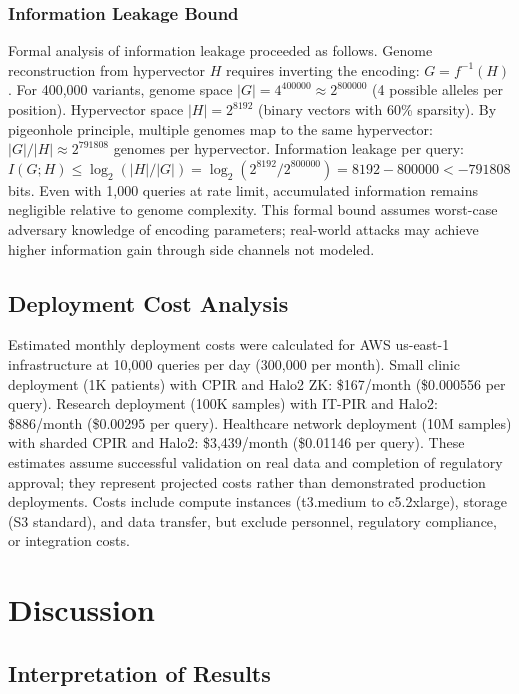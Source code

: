 \documentclass[11pt,letterpaper]{article}
\begin{document}
\subsubsection{Information Leakage Bound}

Formal analysis of information leakage proceeded as follows. Genome reconstruction from hypervector $H$ requires inverting the encoding: $G = f^{-1}(H)$. For 400,000 variants, genome space $|G| = 4^{400000} \approx 2^{800000}$ (4 possible alleles per position). Hypervector space $|H| = 2^{8192}$ (binary vectors with 60\% sparsity). By pigeonhole principle, multiple genomes map to the same hypervector: $|G|/|H| \approx 2^{791808}$ genomes per hypervector. Information leakage per query: $I(G; H) \leq \log_2(|H|/|G|) = \log_2(2^{8192}/2^{800000}) = 8192 - 800000 < -791808$ bits. Even with 1,000 queries at rate limit, accumulated information remains negligible relative to genome complexity. This formal bound assumes worst-case adversary knowledge of encoding parameters; real-world attacks may achieve higher information gain through side channels not modeled.

\subsection{Deployment Cost Analysis}

Estimated monthly deployment costs were calculated for AWS us-east-1 infrastructure at 10,000 queries per day (300,000 per month). Small clinic deployment (1K patients) with CPIR and Halo2 ZK: \$167/month (\$0.000556 per query). Research deployment (100K samples) with IT-PIR and Halo2: \$886/month (\$0.00295 per query). Healthcare network deployment (10M samples) with sharded CPIR and Halo2: \$3,439/month (\$0.01146 per query). These estimates assume successful validation on real data and completion of regulatory approval; they represent projected costs rather than demonstrated production deployments. Costs include compute instances (t3.medium to c5.2xlarge), storage (S3 standard), and data transfer, but exclude personnel, regulatory compliance, or integration costs.

\section{Discussion}

\subsection{Interpretation of Results}
\end{document}
